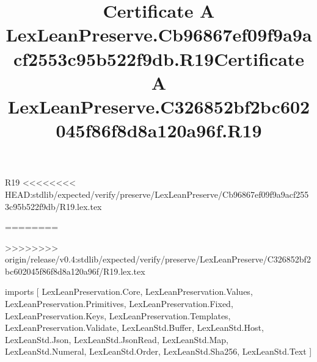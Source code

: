 \begin{lexlean}{R19}
<<<<<<<< HEAD:stdlib/expected/verify/preserve/LexLeanPreserve/Cb96867ef09f9a9acf2553c95b522f9db/R19.lex.tex
\title{Certificate A LexLeanPreserve.Cb96867ef09f9a9acf2553c95b522f9db.R19}
========
\title{Certificate A LexLeanPreserve.C326852bf2bc602045f86f8d8a120a96f.R19}
>>>>>>>> origin/release/v0.4:stdlib/expected/verify/preserve/LexLeanPreserve/C326852bf2bc602045f86f8d8a120a96f/R19.lex.tex
\begin{coremodule}
imports [
  LexLeanPreservation.Core,
  LexLeanPreservation.Values,
  LexLeanPreservation.Primitives,
  LexLeanPreservation.Fixed,
  LexLeanPreservation.Keys,
  LexLeanPreservation.Templates,
  LexLeanPreservation.Validate,
  LexLeanStd.Buffer,
  LexLeanStd.Host,
  LexLeanStd.Json,
  LexLeanStd.JsonRead,
  LexLeanStd.Map,
  LexLeanStd.Numeral,
  LexLeanStd.Order,
  LexLeanStd.Sha256,
  LexLeanStd.Text
]


\end{coremodule}
\end{lexlean}
